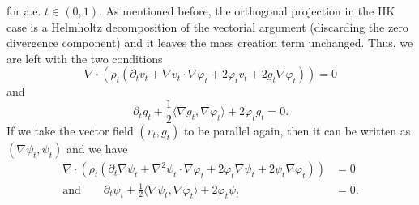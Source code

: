 \documentclass{article}
\begin{document}
for a.e. $t \in (0,1).$ As mentioned before, the orthogonal projection in the HK case is a Helmholtz decomposition of the vectorial argument (discarding the zero divergence component) and it leaves the mass creation term unchanged. Thus, we are left with the two conditions
\begin{equation}
    \nabla \cdot \left(\rho_t\left(\partial_tv_t + \nabla v_t\cdot \nabla\varphi_t + 2\varphi_tv_t +  2g_t\nabla\varphi_t\right)\right) = 0
\end{equation}
and 
\begin{equation}
    \partial_tg_t + \frac{1}{2}\langle\nabla g_t, \nabla\varphi_t\rangle + 2\varphi_t g_t = 0.
\end{equation}
If we take the vector field $(v_t, g_t)$ to be parallel again, then it can be written as $(\nabla\psi_t, \psi_t)$ and we have
\begin{align}
    \nabla \cdot \left(\rho_t\left(\partial_t\nabla \psi_t + \nabla^2\psi_t \cdot \nabla\varphi_t + 2\varphi_t \nabla \psi_t +  2\psi_t\nabla\varphi_t\right)\right) &= 0 \\
    \text{and} \qquad \partial_t\psi_t + \frac{1}{2}\langle\nabla \psi_t, \nabla\varphi_t\rangle + 2\varphi_t \psi_t &= 0.
\end{align}
\end{document}

